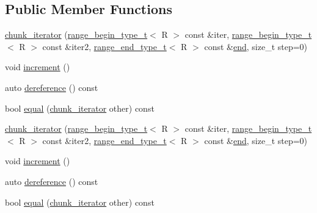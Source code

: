 \subsection*{Public Member Functions}
\begin{DoxyCompactItemize}
\item 
\mbox{\hyperlink{structrah_1_1view_1_1chunk__iterator_a2675282334475c594c96fdcc6c646895}{chunk\+\_\+iterator}} (\mbox{\hyperlink{namespacerah_a28aff4eeddcece6be65ff0b956d32d4a}{range\+\_\+begin\+\_\+type\+\_\+t}}$<$ R $>$ const \&iter, \mbox{\hyperlink{namespacerah_a28aff4eeddcece6be65ff0b956d32d4a}{range\+\_\+begin\+\_\+type\+\_\+t}}$<$ R $>$ const \&iter2, \mbox{\hyperlink{namespacerah_a9657e24ae477f4482225b133fe286b65}{range\+\_\+end\+\_\+type\+\_\+t}}$<$ R $>$ const \&\mbox{\hyperlink{namespacerah_a20a3e45aee90bb5534a00c6b14e06069}{end}}, size\+\_\+t step=0)
\item 
void \mbox{\hyperlink{structrah_1_1view_1_1chunk__iterator_a5159787ea568a933e219a9218daf3e61}{increment}} ()
\item 
auto \mbox{\hyperlink{structrah_1_1view_1_1chunk__iterator_ad552c568bb914a6107bdcb19a5b9aa88}{dereference}} () const
\item 
bool \mbox{\hyperlink{structrah_1_1view_1_1chunk__iterator_a30a848e24020b169cf18626b2034adaf}{equal}} (\mbox{\hyperlink{structrah_1_1view_1_1chunk__iterator}{chunk\+\_\+iterator}} other) const
\item 
\mbox{\hyperlink{structrah_1_1view_1_1chunk__iterator_a2675282334475c594c96fdcc6c646895}{chunk\+\_\+iterator}} (\mbox{\hyperlink{namespacerah_a28aff4eeddcece6be65ff0b956d32d4a}{range\+\_\+begin\+\_\+type\+\_\+t}}$<$ R $>$ const \&iter, \mbox{\hyperlink{namespacerah_a28aff4eeddcece6be65ff0b956d32d4a}{range\+\_\+begin\+\_\+type\+\_\+t}}$<$ R $>$ const \&iter2, \mbox{\hyperlink{namespacerah_a9657e24ae477f4482225b133fe286b65}{range\+\_\+end\+\_\+type\+\_\+t}}$<$ R $>$ const \&\mbox{\hyperlink{namespacerah_a20a3e45aee90bb5534a00c6b14e06069}{end}}, size\+\_\+t step=0)
\item 
void \mbox{\hyperlink{structrah_1_1view_1_1chunk__iterator_a5159787ea568a933e219a9218daf3e61}{increment}} ()
\item 
auto \mbox{\hyperlink{structrah_1_1view_1_1chunk__iterator_ad552c568bb914a6107bdcb19a5b9aa88}{dereference}} () const
\item 
bool \mbox{\hyperlink{structrah_1_1view_1_1chunk__iterator_a30a848e24020b169cf18626b2034adaf}{equal}} (\mbox{\hyperlink{structrah_1_1view_1_1chunk__iterator}{chunk\+\_\+iterator}} other) const
\end{DoxyCompactItemize}
